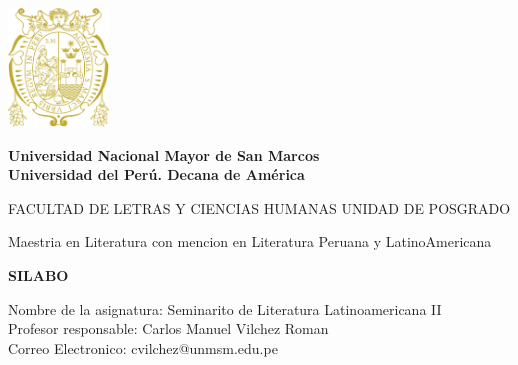 \documentclass[a4paper]{article}
\begin{document}
\begin{titlepage}
\begin{center}
\includegraphics[width=0.2\textwidth]{logo UNMSM.png}
\end{center}
\begin{center}
{\huge \bf Universidad Nacional Mayor de San Marcos}\\[0.3cm]
{\large \bf Universidad del Perú. Decana de América}\\[0.5cm]
\end{center}
\vspace{0.5cm}
\begin{center}
\large{FACULTAD DE LETRAS Y CIENCIAS HUMANAS}
\large{UNIDAD DE POSGRADO}
\end{center}
\vspace{0.5cm}
\begin{center}
{\large Maestria en Literatura con mencion en Literatura Peruana y LatinoAmericana}\\[0.3cm]
\end{center}
\vspace{0.10cm}
\begin{center}
{\huge \bf SILABO}\\[0.3cm]
\end{center}
\vspace{2cm}
\begin{flushleft}
Nombre de la asignatura: Seminarito de Literatura Latinoamericana II \\ 
Profesor responsable: Carlos Manuel Vilchez Roman \\ 
Correo Electronico: cvilchez@unmsm.edu.pe \\ 
\end{flushleft}
\vspace{2cm}
\begin{center}
{\huge \bf }\\[0.3cm]
\end{center}
\end{titlepage}
\newpage
\end{document}
